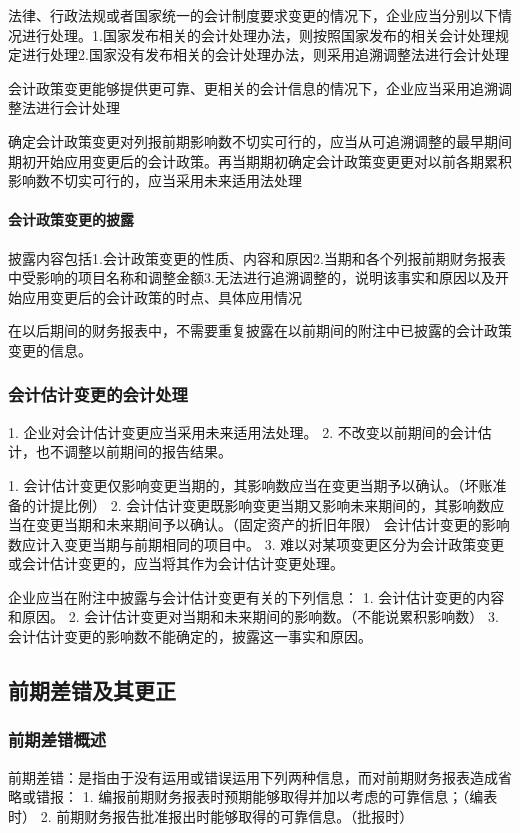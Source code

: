 \documentclass[UTF8,12pt]{ctexart}
\numberwithin{equation}{section} %
\numberwithin{figure}{section}
\numberwithin{table}{section}
\begin{document}
	法律、行政法规或者国家统一的会计制度要求变更的情况下，企业应当分别以下情况进行处理。1.国家发布相关的会计处理办法，则按照国家发布的相关会计处理规定进行处理2.国家没有发布相关的会计处理办法，则采用追溯调整法进行会计处理
	
	会计政策变更能够提供更可靠、更相关的会计信息的情况下，企业应当采用追溯调整法进行会计处理
	
	确定会计政策变更对列报前期影响数不切实可行的，应当从可追溯调整的最早期间期初开始应用变更后的会计政策。再当期期初确定会计政策变更更对以前各期累积影响数不切实可行的，应当采用未来适用法处理
	
	\paragraph{会计政策变更的披露}
	披露内容包括1.会计政策变更的性质、内容和原因2.当期和各个列报前期财务报表中受影响的项目名称和调整金额3.无法进行追溯调整的，说明该事实和原因以及开始应用变更后的会计政策的时点、具体应用情况
	
	在以后期间的财务报表中，不需要重复披露在以前期间的附注中已披露的会计政策变更的信息。
	
	\subsubsection{会计估计变更的会计处理}
	1.	企业对会计估计变更应当采用未来适用法处理。
	2.	不改变以前期间的会计估计，也不调整以前期间的报告结果。
	
	1.	会计估计变更仅影响变更当期的，其影响数应当在变更当期予以确认。（坏账准备的计提比例）
	2.	会计估计变更既影响变更当期又影响未来期间的，其影响数应当在变更当期和未来期间予以确认。（固定资产的折旧年限）
	会计估计变更的影响数应计入变更当期与前期相同的项目中。
	3.	难以对某项变更区分为会计政策变更或会计估计变更的，应当将其作为会计估计变更处理。
	
	企业应当在附注中披露与会计估计变更有关的下列信息：
	1.	会计估计变更的内容和原因。
	2.	会计估计变更对当期和未来期间的影响数。（不能说累积影响数）
	3.会计估计变更的影响数不能确定的，披露这一事实和原因。
	
	\subsection{前期差错及其更正}
	\subsubsection{前期差错概述}
	前期差错：是指由于没有运用或错误运用下列两种信息，而对前期财务报表造成省略或错报：
	1.	编报前期财务报表时预期能够取得并加以考虑的可靠信息；（编表时）
	2.	前期财务报告批准报出时能够取得的可靠信息。（批报时）
	
\end{document}
